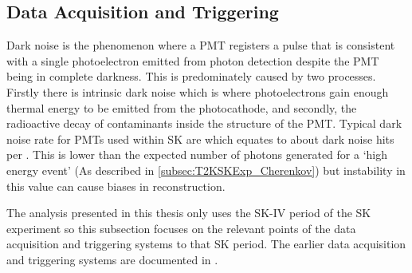 
\subsection{Data Acquisition and Triggering}
\label{subsec:T2KSKExp_SKTriggering}

Dark noise is the phenomenon where a PMT registers a pulse that is consistent with a single photoelectron emitted from photon detection despite the PMT being in complete darkness. This is predominately caused by two processes. Firstly there is intrinsic dark noise which is where photoelectrons gain enough thermal energy to be emitted from the photocathode, and secondly, the radioactive decay of contaminants inside the structure of the PMT. Typical dark noise rate for PMTs used within SK are  \cite{Fukuda2003-ly} which equates to about  dark noise hits per  \cite{Carminati2015-zx}. This is lower than the expected number of photons generated for a `high energy event' (As described in \autoref{subsec:T2KSKExp_Cherenkov}) but instability in this value can cause biases in reconstruction.

The analysis presented in this thesis only uses the SK-IV period of the SK experiment so this subsection focuses on the relevant points of the data acquisition and triggering systems to that SK period.
The earlier data acquisition and triggering systems are documented in \cite{34489,PhysRevD.73.112001}. 

